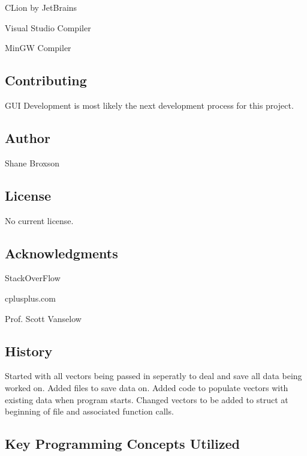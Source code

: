 \begin{DoxyItemize}
\item C\+Lion by Jet\+Brains
\item Visual Studio Compiler
\item Min\+GW Compiler \subsection*{Contributing}
\end{DoxyItemize}

G\+UI Development is most likely the next development process for this project. \subsection*{Author}


\begin{DoxyItemize}
\item Shane Broxson \subsection*{License}
\end{DoxyItemize}

No current license. \subsection*{Acknowledgments}


\begin{DoxyItemize}
\item Stack\+Over\+Flow
\item cplusplus.\+com
\item Prof. Scott Vanselow \subsection*{History}
\end{DoxyItemize}

Started with all vectors being passed in seperatly to deal and save all data being worked on. Added files to save data on. Added code to populate vectors with existing data when program starts. Changed vectors to be added to struct at beginning of file and associated function calls. \subsection*{Key Programming Concepts Utilized}